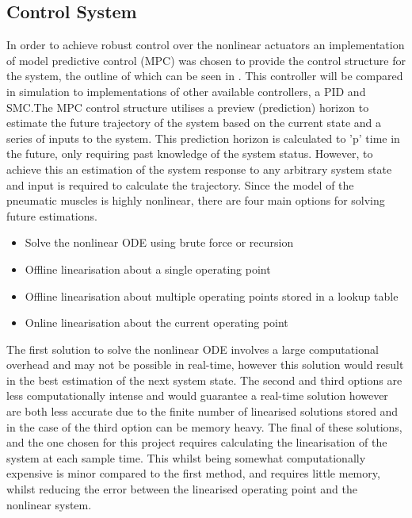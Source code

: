\documentclass[11pt,a4paper]{article}
\begin{document}
\subsection{Control System}
\label{sub:control_system}
In order to achieve robust control over the nonlinear actuators an implementation of model predictive control (MPC) was chosen to provide the control structure for the system, the outline of which can be seen in . This controller will be compared in simulation to implementations of other available controllers, a PID and SMC.The MPC control structure utilises a preview (prediction) horizon to estimate the future trajectory of the system based on the current state and a series of inputs to the system. This prediction horizon is calculated to 'p' time in the future, only requiring past knowledge of the system status. However, to achieve this an estimation of the system response to any arbitrary system state and input is required to calculate the trajectory. Since the model of the pneumatic muscles is highly nonlinear, there are four main options for solving future estimations.
\begin{itemize}
    \item Solve the nonlinear ODE using brute force or recursion
    \item Offline linearisation about a single operating point
    \item Offline linearisation about multiple operating points stored in a lookup table
    \item Online linearisation about the current operating point
\end{itemize}

The first solution to solve the nonlinear ODE involves a large computational overhead and may not be possible in real-time, however this solution would result in the best estimation of the next system state. The second and third options are less computationally intense and would guarantee a real-time solution however are both less accurate due to the finite number of linearised solutions stored and in the case of the third option can be memory heavy. The final of these solutions, and the one chosen for this project requires calculating the linearisation of the system at each sample time. This whilst being somewhat computationally expensive is minor compared to the first method, and requires little memory, whilst reducing the error between the linearised operating point and the nonlinear system.\newline
\end{document}
